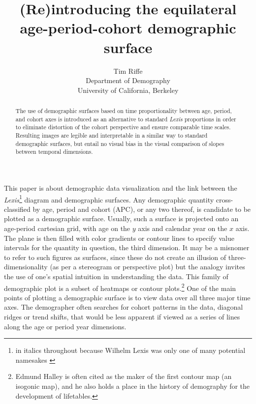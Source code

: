 \documentclass[a4paper]{article}
\begin{document}
\title{(Re)introducing the equilateral age-period-cohort demographic surface}
\author{Tim Riffe \\ Department of Demography \\ University of California, Berkeley}
\maketitle

\thispagestyle{empty} %
\pagestyle{empty}

\vspace{2cm}

\begin{abstract}
The use of demographic surfaces based on time proportionality between age, period, and cohort axes is introduced as an alternative to standard \textit{Lexis} proportions in order to eliminate distortion of the cohort perspective and ensure comparable time scales. Resulting images are legible and interpretable in a similar way to standard demographic surfaces, but entail no visual bias in the visual comparison of slopes between temporal dimensions.
\end{abstract}

\pagebreak

This paper is about demographic data visualization and the link between the \textit{Lexis}\footnote{in italics throughout because Wilhelm Lexis was only one of many potential namesakes \citep{vandeschrick2001lexis, keiding2011age}} diagram and demographic surfaces. Any demographic quantity cross-classified by age, period and cohort (APC), or any two thereof, is candidate to be plotted as a demographic surface. Usually, such a surface is projected onto an age-period cartesian grid, with age on the $y$ axis and calendar year on the $x$ axis. The plane is then filled with color gradients or contour lines to specify value intervals for the quantity in question, the third dimension. It may be a misnomer to refer to such figures as surfaces, since these do not create an illusion of three-dimensionality (as per a stereogram or perspective plot) but the analogy invites the use of one's spatial intuition in understanding the data. This family of demographic plot is a subset of heatmaps or contour plots.\footnote{Edmund Halley is often cited as the maker of the first contour map (an isogonic map), and he also holds a place in the history of demography for the development of lifetables.} One of the main points of plotting a demographic surface is to view data over all three major time axes. The demographer often searches for cohort patterns in the data, diagonal ridges or trend shifts, that would be less apparent if viewed as a series of lines along the age or period year dimensions.
\end{document}
